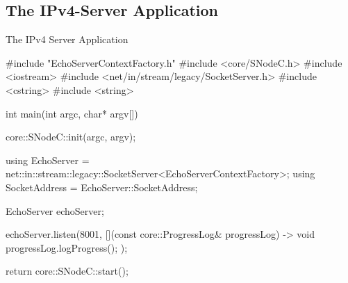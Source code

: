 ﻿\subsection{The IPv4-Server Application}

\begin{frame}[fragile]{The IPv4 Server Application}
  \begin{cppcode}[autogobble=true, caption={IPv4 server application.},captionpos=b]
    #include "EchoServerContextFactory.h"
    #include <core/SNodeC.h>
    #include <iostream>
    #include <net/in/stream/legacy/SocketServer.h>
    #include <cstring>
    #include <string>

    int main(int argc, char* argv[]) {
      core::SNodeC::init(argc, argv);

      using EchoServer = net::in::stream::legacy::SocketServer<EchoServerContextFactory>;
      using SocketAddress = EchoServer::SocketAddress;

      EchoServer echoServer;

      echoServer.listen(8001, [](const core::ProgressLog& progressLog) -> void {
        progressLog.logProgress();
      });

      return core::SNodeC::start();
    }
  \end{cppcode}
\end{frame}
